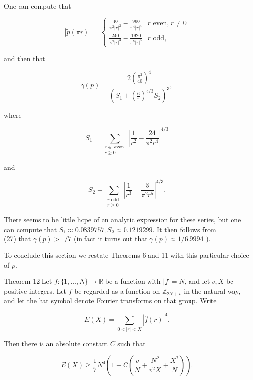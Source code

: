 \documentclass[10pt]{article}
\begin{document}
One can compute that

\[
|\tilde{p}(\pi r)|= \begin{cases}\frac{40}{\pi^{2}|r|^{2}}-\frac{960}{\pi^{4}|r|^{4}} & r \text { even, } r \neq 0  \tag{26}\\ \frac{240}{\pi^{3}|r|^{3}}-\frac{1920}{\pi^{5}|r|^{5}} & r \text { odd, }\end{cases}
\]

and then that


\begin{equation*}
\gamma(p)=\frac{2\left(\frac{\pi^{2}}{40}\right)^{4}}{\left(S_{1}+\left(\frac{6}{\pi}\right)^{4 / 3} S_{2}\right)^{3}}, \tag{27}
\end{equation*}


where


\begin{equation*}
S_{1}=\sum_{\substack{r \in \text { even } \\ r \geq 0}}\left|\frac{1}{r^{2}}-\frac{24}{\pi^{2} r^{4}}\right|^{4 / 3} \tag{28}
\end{equation*}


and


\begin{equation*}
S_{2}=\sum_{\substack{r \text { odd } \\ r \geq 0}}\left|\frac{1}{r^{3}}-\frac{8}{\pi^{2} r^{5}}\right|^{4 / 3} . \tag{29}
\end{equation*}


There seems to be little hope of an analytic expression for these series, but one can compute that $S_{1} \approx 0.0839757, S_{2} \approx 0.1219299$. It then follows from\\
(27) that $\gamma(p)>1 / 7$ (in fact it turns out that $\gamma(p) \approx 1 / 6.9994$ ).

To conclude this section we restate Theorems 6 and 11 with this particular choice of $p$.

Theorem 12 Let $f:\{1, \ldots, N\} \rightarrow \mathbb{R}$ be a function with $|f|=N$, and let $v, X$ be positive integers. Let $f$ be regarded as a function on $\mathbb{Z}_{2 N+v}$ in the natural way, and let the hat symbol denote Fourier transforms on that group. Write

$$
E(X)=\sum_{0<|r|<X}|\hat{f}(r)|^{4} .
$$

Then there is an absolute constant $C$ such that

$$
E(X) \geq \frac{1}{7} N^{4}\left(1-C\left(\frac{v}{N}+\frac{N^{2}}{v^{2} X}+\frac{X^{2}}{N}\right)\right) .
$$
\end{document}
